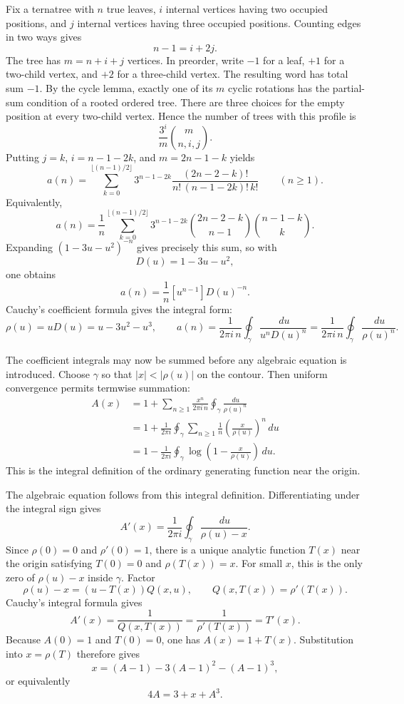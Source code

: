 \documentclass[11pt,fleqn]{article}
\theoremstyle{plain}
\newcommand{\dd}{\,d}
\begin{document}
Fix a ternatree with $n$ true leaves, $i$ internal vertices having two occupied
positions, and $j$ internal vertices having three occupied positions.  Counting
edges in two ways gives
\[
n-1=i+2j.
\]
The tree has $m=n+i+j$ vertices.  In preorder, write $-1$ for a leaf, $+1$ for
a two-child vertex, and $+2$ for a three-child vertex.  The resulting word has
total sum $-1$.  By the cycle lemma, exactly one of its $m$ cyclic rotations
has the partial-sum condition of a rooted ordered tree.  There are three choices
for the empty position at every two-child vertex.  Hence the number of trees
with this profile is
\[
\frac{3^i}{m}\binom{m}{n,i,j}.
\]
Putting $j=k$, $i=n-1-2k$, and $m=2n-1-k$ yields
\[
a(n)=\sum_{k=0}^{\lfloor(n-1)/2\rfloor}
3^{n-1-2k}\frac{(2n-2-k)!}{n!\,(n-1-2k)!\,k!}\qquad(n\ge1).
\]
Equivalently,
\[
a(n)=\frac1n\sum_{k=0}^{\lfloor(n-1)/2\rfloor}
3^{n-1-2k}
\binom{2n-2-k}{n-1}
\binom{n-1-k}{k}.
\]
Expanding $(1-3u-u^2)^{-n}$ gives precisely this sum, so with
\[
D(u)=1-3u-u^2,
\]
one obtains
\[
a(n)=\frac1n[u^{n-1}]D(u)^{-n}.
\]
Cauchy's coefficient formula gives the integral form:
\[
\rho(u)=uD(u)=u-3u^2-u^3,\qquad
a(n)=\frac{1}{2\pi i\,n}\oint_\gamma
\frac{\dd u}{u^nD(u)^n}
=\frac{1}{2\pi i\,n}\oint_\gamma\frac{\dd u}{\rho(u)^n}.
\]

The coefficient integrals may now be summed before any algebraic equation is
introduced.  Choose $\gamma$ so that $|x|<|\rho(u)|$ on the contour.  Then
uniform convergence permits termwise summation:
\[
\begin{aligned}
A(x)
&=1+\sum_{n\ge1}\frac{x^n}{2\pi i\,n}
  \oint_\gamma\frac{\dd u}{\rho(u)^n}\\
&=1+\frac{1}{2\pi i}\oint_\gamma
  \sum_{n\ge1}\frac1n\left(\frac{x}{\rho(u)}\right)^n\dd u\\
&=1-\frac{1}{2\pi i}\oint_\gamma
  \log\!\left(1-\frac{x}{\rho(u)}\right)\dd u.
\end{aligned}
\]
This is the integral definition of the ordinary generating function near the
origin.

The algebraic equation follows from this integral definition.  Differentiating
under the integral sign gives
\[
A'(x)=\frac{1}{2\pi i}\oint_\gamma
\frac{\dd u}{\rho(u)-x}.
\]
Since $\rho(0)=0$ and $\rho'(0)=1$, there is a unique analytic function
$T(x)$ near the origin satisfying $T(0)=0$ and $\rho(T(x))=x$.  For small
$x$, this is the only zero of $\rho(u)-x$ inside $\gamma$.  Factor
\[
\rho(u)-x=(u-T(x))Q(x,u),
\qquad Q(x,T(x))=\rho'(T(x)).
\]
Cauchy's integral formula gives
\[
A'(x)=\frac{1}{Q(x,T(x))}
      =\frac{1}{\rho'(T(x))}
      =T'(x).
\]
Because $A(0)=1$ and $T(0)=0$, one has $A(x)=1+T(x)$.  Substitution into
$x=\rho(T)$ therefore gives
\[
x=(A-1)-3(A-1)^2-(A-1)^3,
\]
or equivalently
\[
4A=3+x+A^3.
\]
\end{document}
